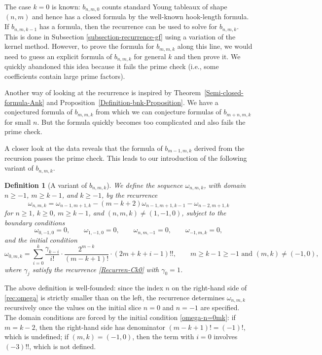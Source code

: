 \documentclass[reqno, 12pt]{article}
\theoremstyle{mydefinition}
\newtheorem{dfn}[thm]{Definition}
\theoremstyle{myremark}
\numberwithin{algorithm}{section}
\begin{document}
The case $k=0$ is known: $b_{n,m,0}$ counts standard Young tableaux of shape $(n,m)$ and hence has a closed formula by the well-known hook-length formula.
If $b_{n,m,k-1}$ has a formula, then the recurrence can be used to solve for $b_{n,m,k}$. This is done in Subsection \ref{subsection-recurrence-gf} using a variation of the kernel method.
However, to prove the formula for $b_{m,m,k}$ along this line, we would need to guess an explicit formula of $b_{n,m,k}$ for general $k$ and then prove it. We quickly abandoned this idea because it fails the prime check (i.e., some coefficients contain large prime factors).

Another way of looking at the recurrence is inspired by Theorem~\ref{Semi-closed-formula-Ank} and Proposition~\ref{Definition-bnk-Proposition}.
We have a conjectured formula of $b_{m,m,k}$ from which we can conjecture formulas of $b_{m+n,m,k}$ for small $n$. But the formula
quickly becomes too complicated and also fails the prime check.

A closer look at the data reveals that the formula of $b_{m-1,m,k}$ derived from the recursion passes the prime check.
This leads to our introduction of the following variant of $b_{n,m,k}$.


\begin{dfn}[A variant of $b_{n,m,k}$]\label{Def-Omega-nmk}
We define the sequence $\omega_{n,m,k}$, with domain $n\ge -1$, $m\ge k-1$, and $k\ge -1$, by the recurrence
\begin{equation}\label{rec:omega}
\omega_{n,m,k}=\omega_{n-1,m+1,k}-(m-k+2)\omega_{n-1,m+1,k-1}-\omega_{n-2,m+1,k}
\end{equation}
for $n\ge 1$, $k\ge 0$, $m\ge k-1$, and $(n,m,k)\neq (1,-1,0)$,
subject to the boundary conditions
\[
\omega_{0,-1,0}=0,\qquad  \omega_{1,-1,0}=0, \qquad \omega_{n,m,-1}=0,\qquad \omega_{-1,m,k}=0,
\]
and the initial condition
\begin{equation}\label{omega-n=0mk}
\omega_{0,m,k}=\sum_{i=0}^k \frac{\gamma_{k-i}}{i!}\cdot \frac{2^{m-k}}{(m-k+1)!}\cdot (2m+k+i-1)!!,\qquad m\ge k-1\ge -1 \text{ and } (m,k)\neq (-1,0),
\end{equation}
where $\gamma_j$ satisfy the recurrence \eqref{Recurren-Ck0} with $\gamma_0=1$.
\end{dfn}

The above definition is well-founded: since the index $n$ on the right-hand side of \eqref{rec:omega} is strictly smaller than on the left, the recurrence determines $\omega_{n,m,k}$ recursively once the values on the initial slice $n=0$ and $n=-1$ are specified. The domain conditions are forced by the initial condition \eqref{omega-n=0mk}: if $m=k-2$, then the right-hand side has denominator $(m-k+1)!=(-1)!$, which is undefined; if $(m,k)=(-1,0)$, then the term with $i=0$ involves $(-3)!!$, which is not defined.
\end{document}
